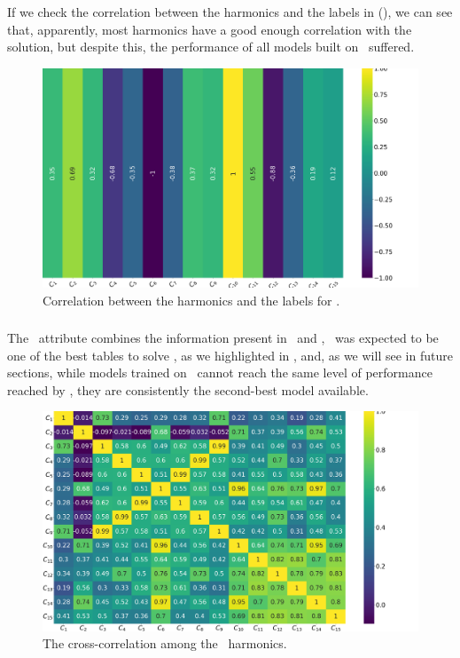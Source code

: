 If we check the correlation between the harmonics and the labels in (), we can see
that, apparently, most harmonics have a good enough correlation with the solution, but despite this, the performance of all
models built on \bn\ suffered.
\begin{figure}[!ht]
	\centering
	\includegraphics[width=\linewidth]{img/Bn_label_corr.png}
	\caption{Correlation between the harmonics and the labels for \bn.} \label{fig:bn-lcorr}
\end{figure}

\subsubsection{\cnmod}
The \cnmod\ attribute combines the information present in \an\ and \bn, \cnmod\ was expected to be one
of the best tables to solve \qrp, as we highlighted in , and, as we will see in
future sections, while models trained on \cnmod\ cannot reach the same level of performance reached
by \an, they are consistently the second-best model available.
\begin{figure}[!ht]
	\centering
	\includegraphics[width=\linewidth]{img/Cnmod_corr_matrix.png}
	\caption{The cross-correlation among the \cnmod\ harmonics.} \label{fig:cnmod-corr}
\end{figure}

